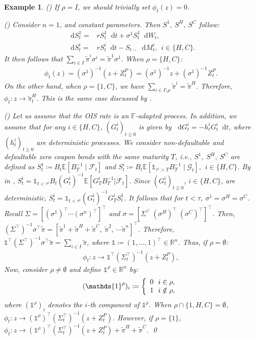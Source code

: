 \documentclass[a4paper, 11pt]{article}              %
\numberwithin{equation}{section}
\theoremstyle{plain}
\newcommand{\1}{\mathds{1}}
\newcommand{\calF}{\mathcal{F}}
\newcommand{\calG}{\mathcal{G}}
\newcommand{\pit}{\tilde{\pi}}
\newcommand{\dsE}{\mathbb{E}}
\newcommand{\dsF}{\mathbb{F}}
\newcommand{\dsR}{\mathbb{R}}
\newcommand{\IT}{^i_t}
\theoremstyle{plain}
\theoremstyle{definition}
\newtheorem{example}[thm]{Example}
\theoremstyle{plain}
\newtheorem{example}{Example}
\newcommand*\df{\mathop{}\!\mathrm{d}}
\newcommand{\rom}[1]{\lowercase\expandafter{\romannumeral #1\relax}}
\begin{document}
\begin{example}\label{example:generator}
  (\rom{1}) If $\rho = I$, we should trivially set 
  $\phi_t (z)= 0$.
  
(\rom{2}) Consider $n=1$, and constant parameters. Then $S^1,~S^H,~S^C $ follow:
\begin{align}
  \df S^1_t =& r S^1_t \df t+\sigma^1 S^1_t\df W_t, \nonumber\\
  \df S^i_t =& r S^i_t \df t - S_{t-}\df M\IT,~~i \in \{ H, C\}. \nonumber
\end{align}
It then follows that
 $\sum_{i \in I}\tilde{\pi}^i\sigma^i = \pit^1 \sigma^1$.
When $\rho = \{H, C\}$:
\begin{align}
  \phi_t(z)=  (\sigma^1)^{-1}(z + Z^P_t) = (\sigma^1)^{-1}z +
  (\sigma^1)^{-1}Z^P_t.  \label{trans1} 
\end{align}
On the other hand, when $\rho =\{1, C\}$, we have $\sum_{i \in I\setminus\rho}\pit^i = \pit^H$. Therefore,
  $\phi_t \colon z \to   \pit^H_t$. 
This is the same case discussed by \cite{burgard2010partial}. 

(\rom{3}) Let us assume that the OIS rate is an $\dsF$-adapted
process. In addition, we assume that for any $i \in \{H, C\}$,
$(G^i_t)_{t \geq0}$ is given by
    $\df G\IT = -h\IT G\IT \df t$,    
  where $(h\IT)_{t\geq0}$ are deterministic processes.  We consider non-defaultable
  and defaultable zero coupon bonds with the same maturity  $T$, i.e.,
  $S^1, ~S^H, ~S^C$ are defined as $ S^1_t \coloneqq  B_t\dsE[
  B_T^{-1}\mid\calF_t]$ and $S^i_t \coloneqq  B_t\dsE[ \1_{\tau^i > T }B_T^{-1}\mid\calG_t], ~~i \in \{H, C\}$. 
By  in ,
$ S^i_t = \1_{t < \tau^i}B_t(G^i_t)^{-1}\dsE[ G^i_TB_T^{-1}|\calF_t] $.  Since
$(G^i_t)_{t \geq0}$, $i \in \{H, C\}$, are deterministic,
  $S^i_t = \1_{t < \tau^i}(G^i_t)^{-1} G^i_TS^1_t$. 
It follows that for $t < \tau$, $\sigma^1 = \sigma^H = \sigma^C$. Recall $\Sigma= [(\sigma^1)^\top \cdots
(\sigma^n)^\top]^\top$ and $\sigma = [\Sigma^\top~ (\sigma^H)^\top~ (\sigma^C)^\top]^{\top}$. Then,
  $(\Sigma^\top)^{-1}\sigma^\top\pit = 
  [\pit^1+\pit^H+\pit^C, ~ \pit^2 , ~\cdots \pit^n ]^\top$.
Therefore, $\1^\top(\Sigma^\top)^{-1}\sigma^\top\pit = \sum_{i \in I}\pit$, where
$\1 \coloneqq (1, \dots,1)^\top \in\dsR^n$. Thus, if $\rho = \emptyset$:
\begin{align}
 \phi_t\colon z \to  \1^\top(\Sigma^\top_t)^{-1}(z + Z^P_t), \label{trans3}
\end{align}
Now, consider $\rho \not=\emptyset $ and  define $\1^\rho \in \dsR^n$ by:
\begin{align}
  (\1^\rho)_i\coloneqq
\left\lbrace
  \begin{array}{r@{}l}
    0 ~~ & i \in \rho,\\
    1~~  & i\notin \rho,
  \end{array}
  \right. \nonumber  
\end{align}
where $(\1^\rho)_i$ denotes the $i$-th component of $\1^\rho$. When
$\rho\cap \{1, H, C\} = \emptyset$,
$\phi_t\colon z \to (\1^\rho)^\top(\Sigma^\top_t)^{-1}(z + Z^P_t)$. However, if $\rho = \{1\}$,
  $\phi_t\colon z \to  (\1^\rho)^\top(\Sigma^\top_t)^{-1}(z + Z^P_t) +\pit^H + \pit^C$.  \qed
\end{example}
\end{document}
